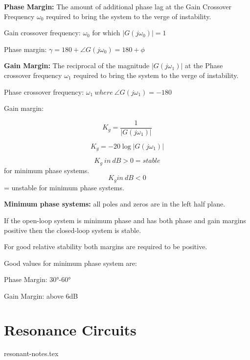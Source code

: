\documentclass{report}
\theoremstyle{plain}
\theoremstyle{definition}
\theoremstyle{remark}
\begin{document}
\textbf{Phase Margin:} The amount of additional phase lag at the Gain
Crossover Frequency \(\omega_{0}\) required to bring the system to the
verge of instability.

Gain crossover frequency:
\(\omega_{0}\text{\ for\ which\ }\left| G\left( j\omega_{0} \right) \right| = 1\)

Phase margin:
\(\gamma = 180 + \angle G\left( j\omega_{0} \right) = 180 + \phi\)

\textbf{Gain Margin:} The reciprocal of the magnitude
\(\left| G(j\omega_{1}) \right|\) at the Phase crossover frequency
\(\omega_{1}\) required to bring the system to the verge of instability.

Phase crossover frequency:
\(\omega_{1}\ where\ \angle G\left( j\omega_{1} \right) = - 180\)

Gain margin:

\[K_{g} = \frac{1}{\left| G(j\omega_{1}) \right|}\]

\[K_{g} = - 20\log\left| G\left( j\omega_{1} \right) \right|\]

\[K_{g}\ in\ dB > 0 = stable\] for minimum phase systems. 
\[K_{g}in\ dB < 0\] = unstable for minimum phase systems. 

\textbf{Minimum phase systems:} all poles and zeros are in the left half
plane.

If the open-loop system is minimum phase and has both phase and gain
margins positive then the closed-loop system is stable.

For good relative stability both margins are required to be positive.

Good values for minimum phase system are:

Phase Margin: 30°-60°

Gain Margin: above 6dB

\chapter{Resonance Circuits}
{resonant-notes.tex}
\end{document}
